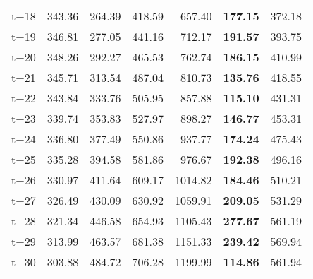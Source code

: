 \begin{table}[H]
\begin{tabular}{lrrrrrr}
t+18  & 343.36  & 264.39  & 418.59  & 657.40  & \textbf{177.15}  & 372.18  \\
t+19  & 346.81  & 277.05  & 441.16  & 712.17  & \textbf{191.57}  & 393.75  \\
t+20  & 348.26  & 292.27  & 465.53  & 762.74  & \textbf{186.15}  & 410.99  \\
t+21  & 345.71  & 313.54  & 487.04  & 810.73  & \textbf{135.76}  & 418.55  \\
t+22  & 343.84  & 333.76  & 505.95  & 857.88  & \textbf{115.10}  & 431.31  \\
t+23  & 339.74  & 353.83  & 527.97  & 898.27  & \textbf{146.77}  & 453.31  \\
t+24  & 336.80  & 377.49  & 550.86  & 937.77  & \textbf{174.24}  & 475.43  \\
t+25  & 335.28  & 394.58  & 581.86  & 976.67  & \textbf{192.38}  & 496.16  \\
t+26  & 330.97  & 411.64  & 609.17  & 1014.82  & \textbf{184.46}  & 510.21  \\
t+27  & 326.49  & 430.09  & 630.92  & 1059.91  & \textbf{209.05}  & 531.29  \\
t+28  & 321.34  & 446.58  & 654.93  & 1105.43  & \textbf{277.67}  & 561.19  \\
t+29  & 313.99  & 463.57  & 681.38  & 1151.33  & \textbf{239.42}  & 569.94  \\
t+30  & 303.88  & 484.72  & 706.28  & 1199.99  & \textbf{114.86}  & 561.94  \\

\bottomrule
\end{tabular}
\end{table}
